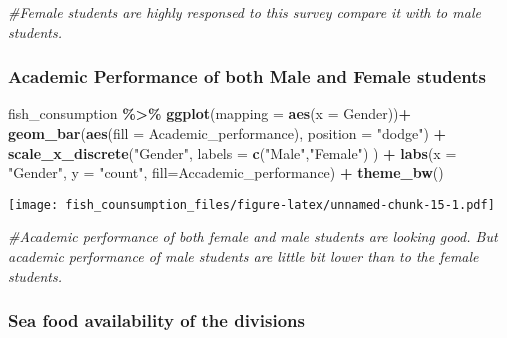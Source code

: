 \documentclass[
]{article}
\newenvironment{Shaded}{\begin{snugshade}}{\end{snugshade}}
\newcommand{\AttributeTok}[1]{\textcolor[rgb]{0.13,0.29,0.53}{#1}}
\newcommand{\CommentTok}[1]{\textcolor[rgb]{0.56,0.35,0.01}{\textit{#1}}}
\newcommand{\FunctionTok}[1]{\textcolor[rgb]{0.13,0.29,0.53}{\textbf{#1}}}
\newcommand{\NormalTok}[1]{#1}
\newcommand{\SpecialCharTok}[1]{\textcolor[rgb]{0.81,0.36,0.00}{\textbf{#1}}}
\newcommand{\StringTok}[1]{\textcolor[rgb]{0.31,0.60,0.02}{#1}}
\begin{document}
\begin{Shaded}
\begin{Highlighting}[]
\CommentTok{\#Female students are highly responsed to this survey compare it with to male students. }
\end{Highlighting}
\end{Shaded}

\hypertarget{academic-performance-of-both-male-and-female-students}{%
\subsubsection{Academic Performance of both Male and Female
students}\label{academic-performance-of-both-male-and-female-students}}

\begin{Shaded}
\begin{Highlighting}[]
\NormalTok{fish\_consumption }\SpecialCharTok{\%\textgreater{}\%}
\FunctionTok{ggplot}\NormalTok{(}\AttributeTok{mapping =} \FunctionTok{aes}\NormalTok{(}\AttributeTok{x =}\NormalTok{ Gender))}\SpecialCharTok{+}
\FunctionTok{geom\_bar}\NormalTok{(}\FunctionTok{aes}\NormalTok{(}\AttributeTok{fill =}\NormalTok{ Academic\_performance), }\AttributeTok{position =} \StringTok{"dodge"}\NormalTok{) }\SpecialCharTok{+}
\FunctionTok{scale\_x\_discrete}\NormalTok{(}\StringTok{"Gender"}\NormalTok{, }\AttributeTok{labels =} \FunctionTok{c}\NormalTok{(}\StringTok{"Male"}\NormalTok{,}\StringTok{"Female"}\NormalTok{) ) }\SpecialCharTok{+}
\FunctionTok{labs}\NormalTok{(}\AttributeTok{x =} \StringTok{"Gender"}\NormalTok{, }\AttributeTok{y =} \StringTok{"count"}\NormalTok{, }\AttributeTok{fill=}\StringTok{\textquotesingle{}Accademic\_performance\textquotesingle{}}\NormalTok{) }\SpecialCharTok{+}
\FunctionTok{theme\_bw}\NormalTok{()}
\end{Highlighting}
\end{Shaded}

\texttt{[image: fish\_counsumption\_files/figure-latex/unnamed-chunk-15-1.pdf]}

\begin{Shaded}
\begin{Highlighting}[]
\CommentTok{\#Academic performance of both female and male students are looking good. But academic performance of male students are little bit lower than to the female students. }
\end{Highlighting}
\end{Shaded}

\hypertarget{sea-food-availability-of-the-divisions}{%
\subsubsection{Sea food availability of the
divisions}\label{sea-food-availability-of-the-divisions}}
\end{document}
